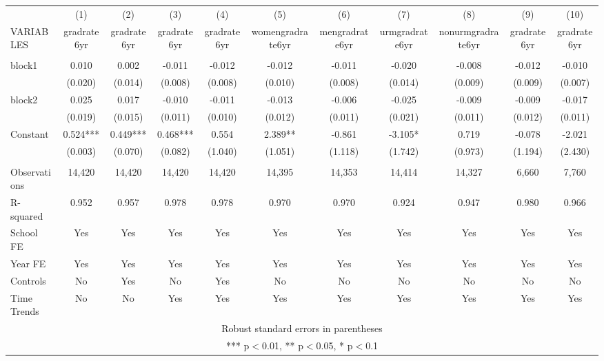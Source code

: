 \documentclass[]{article}
\begin{document}
\begin{tabular}{lcccccccccc} \hline
 & (1) & (2) & (3) & (4) & (5) & (6) & (7) & (8) & (9) & (10) \\
VARIABLES & gradrate6yr & gradrate6yr & gradrate6yr & gradrate6yr & womengradrate6yr & mengradrate6yr & urmgradrate6yr & nonurmgradrate6yr & gradrate6yr & gradrate6yr \\ \hline
 &  &  &  &  &  &  &  &  &  &  \\
block1 & 0.010 & 0.002 & -0.011 & -0.012 & -0.012 & -0.011 & -0.020 & -0.008 & -0.012 & -0.010 \\
 & (0.020) & (0.014) & (0.008) & (0.008) & (0.010) & (0.008) & (0.014) & (0.009) & (0.009) & (0.007) \\
block2 & 0.025 & 0.017 & -0.010 & -0.011 & -0.013 & -0.006 & -0.025 & -0.009 & -0.009 & -0.017 \\
 & (0.019) & (0.015) & (0.011) & (0.010) & (0.012) & (0.011) & (0.021) & (0.011) & (0.012) & (0.011) \\
Constant & 0.524*** & 0.449*** & 0.468*** & 0.554 & 2.389** & -0.861 & -3.105* & 0.719 & -0.078 & -2.021 \\
 & (0.003) & (0.070) & (0.082) & (1.040) & (1.051) & (1.118) & (1.742) & (0.973) & (1.194) & (2.430) \\
 &  &  &  &  &  &  &  &  &  &  \\
Observations & 14,420 & 14,420 & 14,420 & 14,420 & 14,395 & 14,353 & 14,414 & 14,327 & 6,660 & 7,760 \\
R-squared & 0.952 & 0.957 & 0.978 & 0.978 & 0.970 & 0.970 & 0.924 & 0.947 & 0.980 & 0.966 \\
School FE & Yes & Yes & Yes & Yes & Yes & Yes & Yes & Yes & Yes & Yes \\
Year FE & Yes & Yes & Yes & Yes & Yes & Yes & Yes & Yes & Yes & Yes \\
Controls & No & Yes & No & Yes & No & No & No & No & No & No \\
 Time Trends & No & No & Yes & Yes & Yes & Yes & Yes & Yes & Yes & Yes \\ \hline
\multicolumn{11}{c}{ Robust standard errors in parentheses} \\
\multicolumn{11}{c}{ *** p$<$0.01, ** p$<$0.05, * p$<$0.1} \\
\end{tabular}
\end{document}
